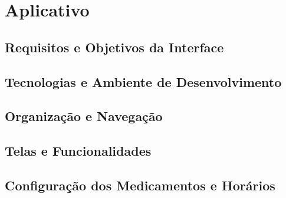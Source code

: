 
\chapter{Aplicativo}
\label{chap:aplicativo}


\section{Requisitos e Objetivos da Interface}
\label{sec:requisitos-aplicativo}


\section{Tecnologias e Ambiente de Desenvolvimento}
\label{sec:tecnologias-aplicativo}


\section{Organização e Navegação}
\label{sec:organizacao-aplicativo}


\section{Telas e Funcionalidades}
\label{sec:telas-funcionalidades}



\section{Configuração dos Medicamentos e Horários}
\label{sec:configuracao-medicamentos}

